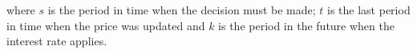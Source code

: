 \documentclass[../thesis.tex]{subfiles}
\begin{document}
where $s$ is the period in time when the decision must be made; $t$ is the last period in time when the price was updated and $k$ is the period in the future when the interest rate applies.

\begin{comment}

Substitute \ref{eq_v2:reg-int-good-firm-TC-MC} in \ref{eq_v2:reg-int-good-firm-optimal-price-problem}:
\begin{align}
	\label{eq_v2:reg-int-good-firm-optimal-price-problem-2}
	\max_{P_{\eta jt}}: & \quad \E \sum_{s=0}^{\infty} \left\{ \frac{\theta^s \big[ P_{\eta jt} Y_{\eta j,t+s} - \Lambda_{\eta, t+s} Y_{\eta j,t+s} \big]}{\prod_{k=0}^{s-1}(1+R_{t+k})} \right\}
\end{align}

Substitute \ref{eq_v2:reg-final-goods-firm-FOC} in \ref{eq_v2:reg-int-good-firm-optimal-price-problem-2} and rearrange the variables:
\begin{align}
	\max_{P_{\eta jt}}: & \quad \E \sum_{s=0}^{\infty} \left\{ \frac{\theta^s \left[ P_{\eta jt} Y_{\eta t+s} \left( \frac{P_{\eta, t+s}}{P_{\eta jt}} \right)^{\psi} - \Lambda_{\eta, t+s} Y_{\eta t+s} \left( \frac{P_{\eta, t+s}}{P_{\eta jt}} \right)^{\psi} \right]}{\prod_{k=0}^{s-1}(1+R_{t+k})} \right\} \implies \nonumber 
	\\
	\max_{P_{\eta jt}}: & \quad \E \sum_{s=0}^{\infty} \left\{ \frac{\theta^s \left[ P_{\eta jt}^{1-\psi} P_{\eta, t+s}^{\psi} Y_{\eta t+s} - P_{\eta jt}^{-\psi} P_{\eta, t+s}^{\psi} Y_{\eta t+s} \Lambda_{\eta, t+s} \right]}{\prod_{k=0}^{s-1}(1+R_{t+k})} \right\} \nonumber
\end{align}


\subsubsection*{First Order Condition}

The first order condition with respect to $P_{\eta jt}$ is:
\begin{align}
	& \quad \E \sum_{s=0}^{\infty} \left\{ \frac{\theta^s \left[ (1-\psi) P_{\eta jt}^{-\psi} P_{\eta, t+s}^{\psi} Y_{\eta t+s} - (-\psi) P_{\eta jt}^{-\psi-1} P_{\eta, t+s}^{\psi} Y_{\eta t+s} \Lambda_{\eta, t+s} \right]}{\prod_{k=0}^{s-1}(1+R_{t+k})} \right\} = 0 \nonumber
\end{align}


Separate the summations and rearrange the variables:
\begin{align}
	\begin{split}
		\E \sum_{s=0}^{\infty} &\left\{ \frac{\theta^s (\psi-1) \left( \frac{P_{\eta, t+s}} {P_{\eta jt}} \right)^{\psi} Y_{\eta t+s}} {\prod_{k=0}^{s-1} (1+R_{t+k})} \right\} = \\
		&= \E \sum_{s=0}^{\infty} \left\{ \frac{\theta^s \psi P_{\eta jt}^{-1} \left( \frac{P_{\eta, t+s}} {P_{\eta jt}} \right)^{\psi} Y_{\eta t+s} \Lambda_{\eta, t+s}}{\prod_{k=0}^{s-1}(1+R_{t+k})} \right\} \label{eq_v2:reg-int-good-firm-optimal-price-FOC}
	\end{split}
\end{align}


\end{comment}
\end{document}
